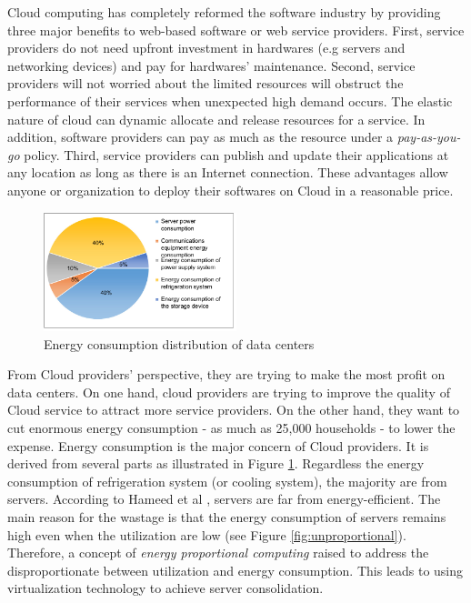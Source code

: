 Cloud computing has completely reformed the software industry \cite{Buyya:2009ix} by providing three major benefits to web-based software or web service providers.
First, service providers do not need upfront investment in hardwares (e.g servers and networking devices) and pay for hardwares' maintenance. 
Second, service providers will not worried about the limited resources will obstruct the performance of their services when unexpected high demand occurs. The elastic nature of cloud can dynamic allocate and release resources for a service. In addition, software providers can pay as much as the resource under a \emph{pay-as-you-go} policy.
Third, service providers can publish and update their applications at any location 
as long as there is an Internet connection. 
These advantages allow anyone or organization to deploy their softwares on Cloud in
a reasonable price. 

\begin{figure}
	\centering
	\includegraphics[width=0.5\textwidth]{pics/energyConsumption.png}
	\caption{Energy consumption distribution of data centers \cite{Rong:2016js}}
	\label{fig:consumption}
\end{figure} 

From Cloud providers' perspective, they are trying to make the most profit on data centers.
On one hand, cloud providers are trying to improve the quality of  Cloud service to attract more service providers.  
On the other hand, they want to cut enormous energy consumption 
- as much as 25,000 households \cite{Kaplan:up01fR-k} - to lower the expense. Energy consumption is the major concern of Cloud providers. It is derived from several parts as 
illustrated in Figure \ref{fig:consumption}. 
Regardless the energy consumption of refrigeration system (or cooling system), 
the majority are from servers.
According to Hameed et al \cite{Hameed:2016cma}, servers are far from energy-efficient. 
The main reason for the wastage is that the energy consumption of servers remains high even when the utilization are low (see Figure \ref{fig:unproportional}). 
Therefore, a concept of
\emph{energy proportional computing} \cite{Barroso:2007jt} raised to address the disproportionate between utilization and energy consumption. This leads to 
using virtualization technology to achieve server consolidation.

